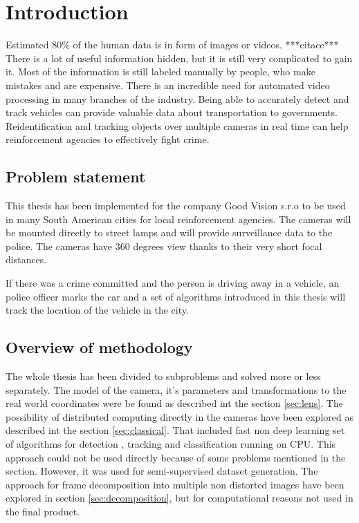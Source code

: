 \documentclass[a4paper,12pt,titlepage, twoside]{article}
\numberwithin{figure}{section}
\begin{document}

\section{Introduction}
Estimated 80\% of the human data is in form of images or videos. ***citace*** There is a lot of useful information hidden, but it is still very complicated to gain it. Most of the information is still labeled manually by people, who make mistakes and are expensive. There is an incredible need for automated video processing in many branches of the industry. Being able to accurately detect and track vehicles can provide valuable data about transportation to governments. Reidentification and tracking objects over multiple cameras in real time can help reinforcement agencies to effectively fight crime. 

\subsection{Problem statement}
This thesis has been implemented for the company Good Vision s.r.o to be used in many South American cities for local reinforcement agencies. The cameras will be mounted directly to street lamps and will provide surveillance data to the police. The cameras have 360 degrees view thanks to their very short focal distances. 

If there was a crime committed and the person is driving away in a vehicle, an police officer marks the car and a set of algorithms introduced in this thesis will track the location of the vehicle in the city.

\subsection{Overview of methodology}

The whole thesis has been divided to subproblems and solved more or less separately. The model of the camera, it's parameters and transformations to the real world coordinates were be found as described int the section \ref{sec:lens}. The possibility of distributed computing directly in the cameras have been explored as described int the section \ref{sec:classical}. That included fast non deep learning set of algorithms for detection \cite{piccardi2004background}, tracking \cite{optical-flow} and classification \cite{haar} running on CPU. This approach could not be used directly because of some problems mentioned in the section. However, it was used for semi-supervised dataset generation. The approach for frame decomposition into multiple non distorted images have been explored in section \ref{sec:decomposition}, but for computational reasons not used in the final product. 
\end{document}
